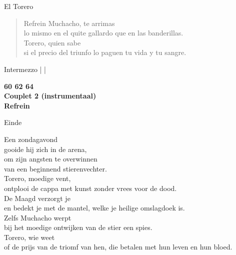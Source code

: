 \begin{song}{El Torero}
\clearpage

\begin{verse}{Refrein}
Muchacho, te arrimas\\
lo mismo en el quite gallardo que en las banderillas.\\
Torero,  quien sabe \\
si el precio del triunfo lo paguen tu vida y tu sangre.
\end{verse}

\begin{instrumental}{Intermezzo}
|   |\\
\end{instrumental}

\textbf{60 62 64}\\

\textbf{Couplet 2 (instrumentaal)}\\

\textbf{Refrein}\\

\begin{instrumental}{Einde}
 
\end{instrumental}
\end{song}

\begin{translation}
Een zondagavond\\
gooide hij zich in de arena,\\
om zijn angsten te overwinnen\\
van een beginnend stierenvechter.\\

Torero, moedige vent,\\
ontplooi de cappa met kunst zonder vrees voor de dood.\\
De Maagd verzorgt je\\
en bedekt je met de mantel, welke je heilige omslagdoek is.\\

Zelfs Muchacho werpt\\
bij het moedige ontwijken van de stier een spies.\\
Torero, wie weet\\
of de prijs van de triomf van hen, die betalen met hun leven en hun
bloed.
\end{translation}
